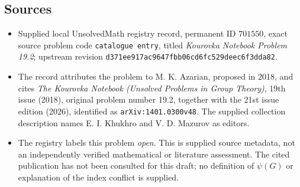 \documentclass[11pt]{article}
\begin{document}
\subsection{Sources}
\begin{itemize}
\item Supplied local UnsolvedMath registry record, permanent ID \(701550\), exact source problem code \texttt{catalogue entry}, titled \emph{Kourovka Notebook Problem 19.2}; upstream revision \texttt{d371ee917ac9647fbb06cd6fc529deec6f3dda82}.
\item The record attributes the problem to M. K. Azarian, proposed in 2018, and cites \emph{The Kourovka Notebook (Unsolved Problems in Group Theory)}, 19th issue (2018), original problem number 19.2, together with the 21st issue edition (2026), identified as \texttt{arXiv:1401.0300v48}. The supplied collection description names E. I. Khukhro and V. D. Mazurov as editors.
\item The registry labels this problem \emph{open}. This is supplied source metadata, not an independently verified mathematical or literature assessment. The cited publication has not been consulted for this draft; no definition of \(\psi(G)\) or explanation of the index conflict is supplied.
\end{itemize}
\end{document}
